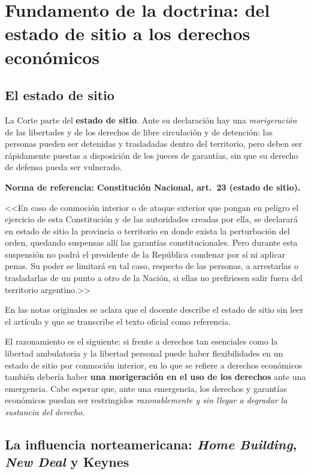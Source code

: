 \documentclass[12pt,oneside]{book}
\begin{document}
\section{Fundamento de la doctrina: del estado de sitio a los derechos económicos}

\subsection{El estado de sitio}

La Corte parte del \textbf{estado de sitio}. Ante su declaración hay una \textit{morigeración} de las libertades y de los derechos de libre circulación y de detención: las personas pueden ser detenidas y trasladadas dentro del territorio, pero deben ser rápidamente puestas a disposición de los jueces de garantías, sin que su derecho de defensa pueda ser vulnerado.

\begin{note}
\textbf{Norma de referencia: Constitución Nacional, art.~23 (estado de sitio).}

<<En caso de conmoción interior o de ataque exterior que pongan en peligro el ejercicio de esta Constitución y de las autoridades creadas por ella, se declarará en estado de sitio la provincia o territorio en donde exista la perturbación del orden, quedando suspensas allí las garantías constitucionales. Pero durante esta suspensión no podrá el presidente de la República condenar por sí ni aplicar penas. Su poder se limitará en tal caso, respecto de las personas, a arrestarlas o trasladarlas de un punto a otro de la Nación, si ellas no prefiriesen salir fuera del territorio argentino.>>

En las notas originales se aclara que el docente describe el estado de sitio sin leer el artículo y que se transcribe el texto oficial como referencia.
\end{note}

El razonamiento es el siguiente: si frente a derechos tan esenciales como la libertad ambulatoria y la libertad personal puede haber flexibilidades en un estado de sitio por conmoción interior, en lo que se refiere a derechos económicos también debería haber \textbf{una morigeración en el uso de los derechos} ante una emergencia. Cabe esperar que, ante una emergencia, los derechos y garantías económicos puedan ser restringidos \textit{razonablemente y sin llegar a degradar la sustancia del derecho}.

\subsection{La influencia norteamericana: \textit{Home Building}, \textit{New Deal} y Keynes}
\end{document}
